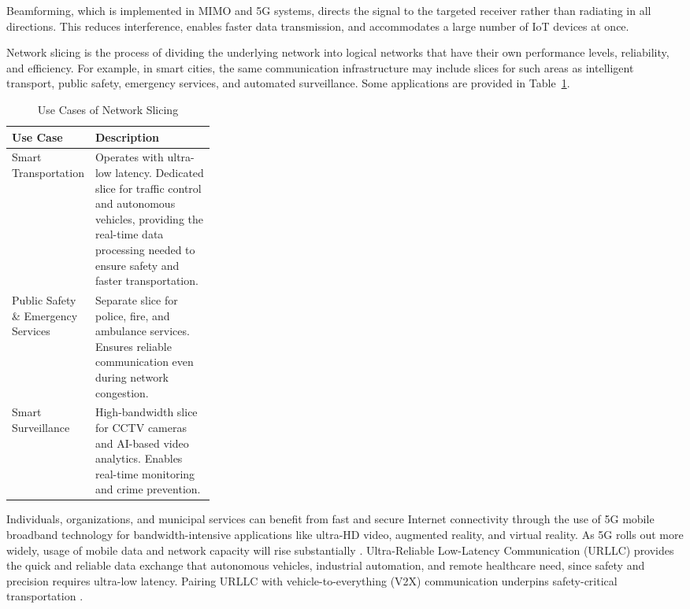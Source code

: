 \documentclass[pdflatex,sn-mathphys-num]{sn-jnl}%
\theoremstyle{thmstyleone}%
\theoremstyle{thmstyletwo}%
\theoremstyle{thmstylethree}%
\begin{document}
Beamforming, which is implemented in MIMO and 5G systems, directs the signal to the targeted receiver rather than radiating in all directions. This reduces interference, enables faster data transmission, and accommodates a large number of IoT devices at once.

Network slicing is the process of dividing the underlying network into logical networks that have their own performance levels, reliability, and efficiency. For example, in smart cities, the same communication infrastructure may include slices for such areas as intelligent transport, public safety, emergency services, and automated surveillance. Some applications are provided in Table~\ref{tab:slicing}.

\begin{table}[!t]
\caption{Use Cases of Network Slicing}
\label{tab:slicing}
\centering
\scriptsize
\setlength{\tabcolsep}{3pt}
\renewcommand{\arraystretch}{1.15}

\begin{tabularx}{\linewidth}{|
>{\raggedright\arraybackslash}p{0.30\linewidth}|
>{\raggedright\arraybackslash}X|}
\hline

\textbf{Use Case} & \textbf{Description} \\
\hline

Smart Transportation &
Operates with ultra-low latency. Dedicated slice for traffic control and autonomous vehicles, providing the real-time data processing needed to ensure safety and faster transportation. \\
\hline

Public Safety \& Emergency Services &
Separate slice for police, fire, and ambulance services. Ensures reliable communication even during network congestion. \\
\hline

Smart Surveillance &
High-bandwidth slice for CCTV cameras and AI-based video analytics. Enables real-time monitoring and crime prevention. \\
\hline

\end{tabularx}
\end{table}

Individuals, organizations, and municipal services can benefit from fast and secure Internet connectivity through the use of 5G mobile broadband technology for bandwidth-intensive applications like ultra-HD video, augmented reality, and virtual reality. As 5G rolls out more widely, usage of mobile data and network capacity will rise substantially \cite{r36}. Ultra-Reliable Low-Latency Communication (URLLC) provides the quick and reliable data exchange that autonomous vehicles, industrial automation, and remote healthcare need, since safety and precision requires ultra-low latency. Pairing URLLC with vehicle-to-everything (V2X) communication underpins safety-critical transportation \cite{r36}.
\end{document}
